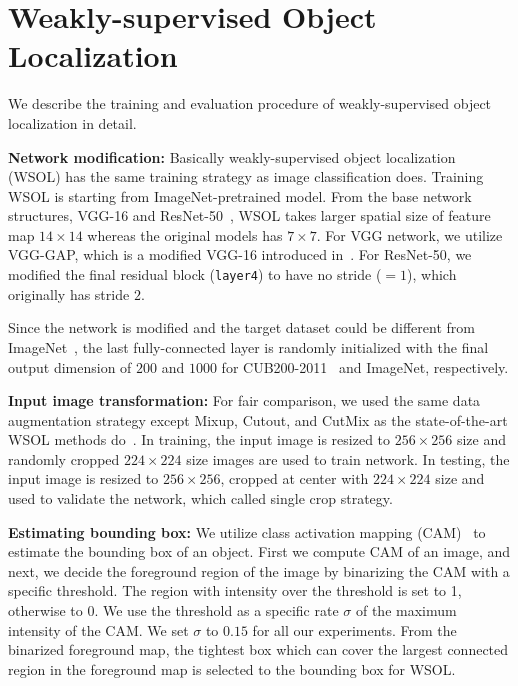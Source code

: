 \section{Weakly-supervised Object Localization}
\label{appendix:wsol}




We describe the training and evaluation procedure of weakly-supervised object localization in detail.

\noindent\textbf{Network modification: }
Basically weakly-supervised object localization (WSOL) has the same training strategy as image classification does. 
Training WSOL is starting from ImageNet-pretrained model. 
From the base network structures, VGG-16 and ResNet-50~\cite{resnet}, WSOL takes larger spatial size of feature map $14 \times 14$ whereas the original models has $7 \times 7$.
For VGG network, we utilize VGG-GAP, which is a modified VGG-16 introduced in~\cite{zhou2016CAM}.
For ResNet-50, we modified the final residual block (\texttt{layer4}) to have no stride ($=1$), which originally has stride $2$. 

Since the network is modified and the target dataset could be different from ImageNet~\cite{ImageNet}, the last fully-connected layer is randomly initialized with the final output dimension of $200$ and $1000$ for CUB200-2011~\cite{wah2011cub} and ImageNet, respectively.


\noindent\textbf{Input image transformation: }
For fair comparison, we used the same data augmentation strategy except Mixup, Cutout, and CutMix as the state-of-the-art WSOL methods do~\cite{singh2017hide,zhang2018ACOL}.
In training, the input image is resized to $256\times256$ size and randomly cropped $224 \times 224$ size images are used to train network.
In testing, the input image is resized to $256\times256$, cropped at center with $224\times224$ size and used to validate the network, which called single crop strategy. 


\noindent\textbf{Estimating bounding box: }
We utilize class activation mapping (CAM)~\cite{zhou2016CAM} to estimate the bounding box of an object. 
First we compute CAM of an image, and next, we decide the foreground region of the image by binarizing the CAM with a specific threshold. 
The region with intensity over the threshold is set to 1, otherwise to 0. 
We use the threshold as a specific rate $\sigma$ of the maximum intensity of the CAM. 
We set $\sigma$ to $0.15$ for all our experiments. 
From the binarized foreground map, the tightest box which can cover the largest connected region in the foreground map is selected to the bounding box for WSOL.


